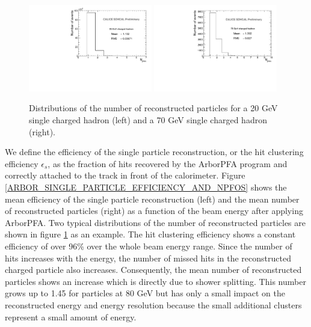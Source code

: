 \documentclass[12pt]{article}
\begin{document}
\begin{figure}[!h]
  \begin{center}
    \includegraphics[width=0.48\textwidth]{plots/SingleParticle_NPfos_20GeV.pdf}
    \includegraphics[width=0.48\textwidth]{plots/SingleParticle_NPfos_70GeV.pdf} \\
  \end{center}
  \caption{\label{ARBOR_SINGLE_PARTICLE_NPFOS_20_AND_70_GEV} Distributions of the number of reconstructed particles for a 20 GeV single charged hadron (left) and a 70 GeV single charged hadron (right).}
\end{figure}

We define the efficiency of the single particle reconstruction, or the hit clustering efficiency $\epsilon_s$, as the fraction of hits recovered by the ArborPFA program and correctly attached to the track in front of the calorimeter. Figure \ref{ARBOR_SINGLE_PARTICLE_EFFICIENCY_AND_NPFOS} shows the mean efficiency of the single particle reconstruction (left) and the mean number of reconstructed particles (right) as a function of the beam energy after applying ArborPFA. Two typical distributions of the number of reconstructed particles are shown in figure \ref{ARBOR_SINGLE_PARTICLE_NPFOS_20_AND_70_GEV} as an example. The hit clustering efficiency shows a constant efficiency of over 96\% over the whole beam energy range. Since the number of hits increases with the energy, the number of missed hits in the reconstructed charged particle also increases. Consequently, the mean number of reconstructed particles shows an increase which is directly due to shower splitting. This number grows up to 1.45 for particles at 80 GeV but has only a small impact on the reconstructed energy and energy resolution because the small additional clusters represent a small amount of energy. 
\end{document}
